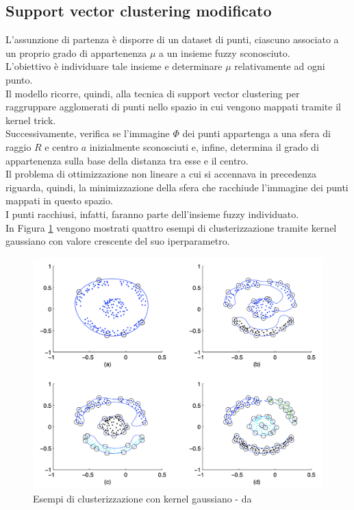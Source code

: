 \documentclass[12pt]{report}
\theoremstyle{definition}
\begin{document}
\subsection{Support vector clustering modificato}
L'assunzione di partenza è disporre di un dataset di punti, ciascuno associato a un proprio grado di appartenenza $\mu$ a un insieme fuzzy sconosciuto.
\\
L'obiettivo è individuare tale insieme e determinare $\mu$ relativamente ad ogni punto.
\\
Il modello ricorre, quindi, alla tecnica di support vector clustering \cite{23} per raggruppare agglomerati di punti nello spazio in cui vengono mappati tramite il kernel trick.
\\
Successivamente, verifica se l'immagine $\mathit{\Phi}$ dei punti appartenga a una sfera di raggio $R$ e centro $a$ inizialmente sconosciuti e, infine, determina il grado di appartenenza sulla base della distanza tra esse e il centro.
\\
Il problema di ottimizzazione non lineare a cui si accennava in precedenza riguarda, quindi, la minimizzazione della sfera che racchiude l'immagine dei punti mappati in questo spazio.
\\
I punti racchiusi, infatti, faranno parte dell'insieme fuzzy individuato.
\\
In Figura \ref{gaussian} vengono mostrati quattro esempi di clusterizzazione tramite kernel gaussiano con valore crescente del suo iperparametro.
\\
\begin{figure}
    \centering
    \includegraphics[scale = 0.7]{images/gaussian_kernel.png}
    \caption{Esempi di clusterizzazione con kernel gaussiano - da \cite{23}}
    \label{gaussian}
\end{figure}
\end{document}
